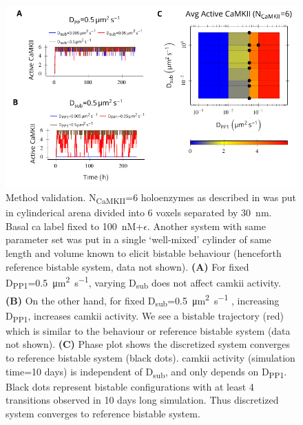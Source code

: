 \documentclass[9pt,lineno]{elife}
\newcommand\SUB[2]{#1\textsubscript{#2}}
\begin{document}
{\begin{figure}[ht!]
    \includegraphics[width=12cm]{./PaperFigures/elifeFigure7/figure_su_long_term_effect.pdf}
    \caption{Method validation. \SUB{N}{CaMKII}=6 holoenzymes as described in
         was put in cylinderical arena divided
        into 6 voxels separated by \SI{30}{\nano\meter}. Basal \gls{ca} label
        fixed to \SI{100}{\nano M}+$\epsilon$. Another system with same parameter set was put in a single
        `well-mixed' cylinder of same length and volume known to elicit bistable
        behaviour (henceforth reference bistable system, data not shown). 
        \textbf{(A)} For fixed \SUB{D}{PP1}=\SI{0.5}{\micro\meter\squared\per\second}, varying
        \SUB{D}{sub} does not affect \gls{camkii} activity. \textbf{(B)} On the
        other hand, for fixed
        \SUB{D}{sub}=\SI{0.5}{\micro\meter\squared\per\second} , increasing
        \SUB{D}{PP1}, increases \gls{camkii} activity. We see a bistable
        trajectory (red) which is similar to the behaviour or reference bistable
        system (data not shown). \textbf{(C)} Phase plot shows the discretized
        system converges to reference bistable system (black dots). \Gls{camkii}
        activity (simulation time=10 days) is independent of \SUB{D}{sub}, and
        only depends on \SUB{D}{PP1}.  Black dots represent bistable
        configurations with at least 4 transitions observed in 10 days long
        simulation. Thus discretized system converges to reference bistable system.
    }\label{fig:method_validation} 


\end{figure}}
\end{document}
